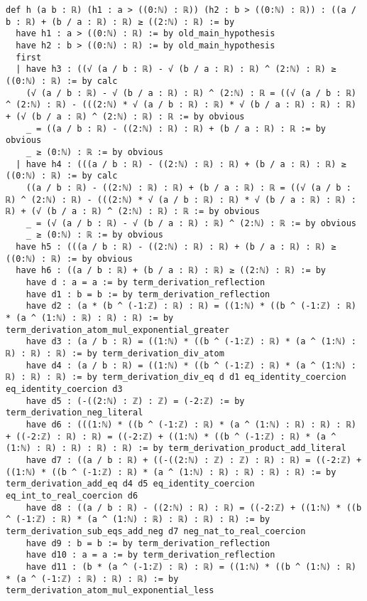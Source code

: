 \documentclass{article}
\begin{document}
\begin{tcolorbox}[colback=white!10, width=\linewidth]
\begin{lstlisting}[language=Lean4]
def h (a b : ℝ) (h1 : a > ((0:ℕ) : ℝ)) (h2 : b > ((0:ℕ) : ℝ)) : ((a / b : ℝ) + (b / a : ℝ) : ℝ) ≥ ((2:ℕ) : ℝ) := by
  have h1 : a > ((0:ℕ) : ℝ) := by old_main_hypothesis
  have h2 : b > ((0:ℕ) : ℝ) := by old_main_hypothesis
  first
  | have h3 : ((√ (a / b : ℝ) - √ (b / a : ℝ) : ℝ) ^ (2:ℕ) : ℝ) ≥ ((0:ℕ) : ℝ) := by calc
    (√ (a / b : ℝ) - √ (b / a : ℝ) : ℝ) ^ (2:ℕ) : ℝ = ((√ (a / b : ℝ) ^ (2:ℕ) : ℝ) - (((2:ℕ) * √ (a / b : ℝ) : ℝ) * √ (b / a : ℝ) : ℝ) : ℝ) + (√ (b / a : ℝ) ^ (2:ℕ) : ℝ) : ℝ := by obvious
    _ = ((a / b : ℝ) - ((2:ℕ) : ℝ) : ℝ) + (b / a : ℝ) : ℝ := by obvious
    _ ≥ (0:ℕ) : ℝ := by obvious
  | have h4 : (((a / b : ℝ) - ((2:ℕ) : ℝ) : ℝ) + (b / a : ℝ) : ℝ) ≥ ((0:ℕ) : ℝ) := by calc
    ((a / b : ℝ) - ((2:ℕ) : ℝ) : ℝ) + (b / a : ℝ) : ℝ = ((√ (a / b : ℝ) ^ (2:ℕ) : ℝ) - (((2:ℕ) * √ (a / b : ℝ) : ℝ) * √ (b / a : ℝ) : ℝ) : ℝ) + (√ (b / a : ℝ) ^ (2:ℕ) : ℝ) : ℝ := by obvious
    _ = (√ (a / b : ℝ) - √ (b / a : ℝ) : ℝ) ^ (2:ℕ) : ℝ := by obvious
    _ ≥ (0:ℕ) : ℝ := by obvious
  have h5 : (((a / b : ℝ) - ((2:ℕ) : ℝ) : ℝ) + (b / a : ℝ) : ℝ) ≥ ((0:ℕ) : ℝ) := by obvious
  have h6 : ((a / b : ℝ) + (b / a : ℝ) : ℝ) ≥ ((2:ℕ) : ℝ) := by
    have d : a = a := by term_derivation_reflection
    have d1 : b = b := by term_derivation_reflection
    have d2 : (a * (b ^ (-1:ℤ) : ℝ) : ℝ) = ((1:ℕ) * ((b ^ (-1:ℤ) : ℝ) * (a ^ (1:ℕ) : ℝ) : ℝ) : ℝ) := by term_derivation_atom_mul_exponential_greater
    have d3 : (a / b : ℝ) = ((1:ℕ) * ((b ^ (-1:ℤ) : ℝ) * (a ^ (1:ℕ) : ℝ) : ℝ) : ℝ) := by term_derivation_div_atom
    have d4 : (a / b : ℝ) = ((1:ℕ) * ((b ^ (-1:ℤ) : ℝ) * (a ^ (1:ℕ) : ℝ) : ℝ) : ℝ) := by term_derivation_div_eq d d1 eq_identity_coercion eq_identity_coercion d3
    have d5 : (-((2:ℕ) : ℤ) : ℤ) = (-2:ℤ) := by term_derivation_neg_literal
    have d6 : (((1:ℕ) * ((b ^ (-1:ℤ) : ℝ) * (a ^ (1:ℕ) : ℝ) : ℝ) : ℝ) + ((-2:ℤ) : ℝ) : ℝ) = ((-2:ℤ) + ((1:ℕ) * ((b ^ (-1:ℤ) : ℝ) * (a ^ (1:ℕ) : ℝ) : ℝ) : ℝ) : ℝ) := by term_derivation_product_add_literal
    have d7 : ((a / b : ℝ) + ((-((2:ℕ) : ℤ) : ℤ) : ℝ) : ℝ) = ((-2:ℤ) + ((1:ℕ) * ((b ^ (-1:ℤ) : ℝ) * (a ^ (1:ℕ) : ℝ) : ℝ) : ℝ) : ℝ) := by term_derivation_add_eq d4 d5 eq_identity_coercion eq_int_to_real_coercion d6
    have d8 : ((a / b : ℝ) - ((2:ℕ) : ℝ) : ℝ) = ((-2:ℤ) + ((1:ℕ) * ((b ^ (-1:ℤ) : ℝ) * (a ^ (1:ℕ) : ℝ) : ℝ) : ℝ) : ℝ) := by term_derivation_sub_eqs_add_neg d7 neg_nat_to_real_coercion
    have d9 : b = b := by term_derivation_reflection
    have d10 : a = a := by term_derivation_reflection
    have d11 : (b * (a ^ (-1:ℤ) : ℝ) : ℝ) = ((1:ℕ) * ((b ^ (1:ℕ) : ℝ) * (a ^ (-1:ℤ) : ℝ) : ℝ) : ℝ) := by term_derivation_atom_mul_exponential_less

\end{lstlisting}
\end{tcolorbox}
\end{document}
